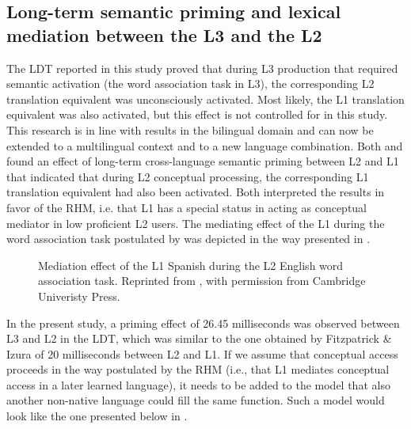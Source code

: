 \documentclass[output=paper,colorlinks,citecolor=brown,nonflat]{langsci/langscibook}
\begin{document}
\subsection{Long-term semantic priming and lexical mediation between the L3 and the L2}\label{sec:gudmundson:4.2}

The LDT reported in this study proved that during L3 production that required semantic activation (the word association task in L3), the corresponding L2 translation equivalent was unconsciously activated. Most likely, the L1 translation equivalent was also activated, but this effect is not controlled for in this study. This research is in line with results in the bilingual domain and can now be extended to a multilingual context and to a new language combination. Both \citet{FitzpatrickIzura2011} and \citet{LiEtAl2009} found an effect of long-term cross-language semantic priming between L2 and L1 that indicated that during L2 conceptual processing, the corresponding L1 translation equivalent had also been activated. Both interpreted the results in favor of the RHM, i.e. that L1 has a special status in acting as conceptual mediator in low proficient L2 users. The mediating effect of the L1 during the word association task postulated by \citet{FitzpatrickIzura2011} was depicted in the way presented in .

\begin{figure}
    \caption{Mediation effect of the L1 Spanish during the L2 English word association task. Reprinted from \citet{FitzpatrickIzura2011}, with permission from Cambridge Univeristy Press.}
    \label{fig:gudmundson:6}
\end{figure}

In the present study, a priming effect of 26.45 milliseconds was observed between L3 and L2 in the LDT, which was similar to the one obtained by Fitzpatrick \& Izura of 20 milliseconds between L2 and L1. If we assume that conceptual access proceeds in the way postulated by the RHM (i.e., that L1 mediates conceptual access in a later learned language), it needs to be added to the model that also another non-native language could fill the same function. Such a model would look like the one presented below in .
\end{document}
